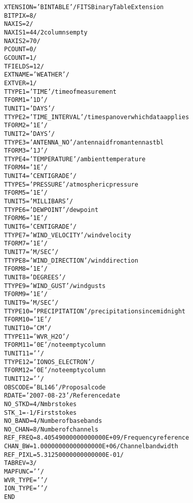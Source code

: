 \documentclass[twoside]{article}
\newcommand{\Me}[1]{\textcolor{mecol}{#1}}
\begin{document}
\begin{alltt}
XTENSION= 'BINTABLE'           / FITS Binary Table Extension
BITPIX  =                    8 /
NAXIS   =                    2 /
NAXIS1  =                   44 / \Me{2 columns empty}
NAXIS2  =                   70 /
PCOUNT  =                    0 /
GCOUNT  =                    1 /
TFIELDS =                   12 /
EXTNAME = 'WEATHER '           /
EXTVER  =                    1 /
TTYPE1  = 'TIME    '           / time of measurement
TFORM1  = '1D      '           /
TUNIT1  = 'DAYS    '           /
TTYPE2  = 'TIME_INTERVAL'      / time span over which data applies
TFORM2  = '1E      '           /
TUNIT2  = 'DAYS    '           /
TTYPE3  = 'ANTENNA_NO'         / antenna id from antennas tbl
TFORM3  = '1J      '           /
TTYPE4  = 'TEMPERATURE'        / ambient temperature
TFORM4  = '1E      '           /
TUNIT4  = 'CENTIGRADE'         /
TTYPE5  = 'PRESSURE'           / atmospheric pressure
TFORM5  = '1E      '           /
TUNIT5  = 'MILLIBARS'          /
TTYPE6  = 'DEWPOINT'           / dewpoint
TFORM6  = '1E      '           /
TUNIT6  = 'CENTIGRADE'         /
TTYPE7  = 'WIND_VELOCITY'      / wind velocity
TFORM7  = '1E      '           /
TUNIT7  = 'M/SEC   '           /
TTYPE8  = 'WIND_DIRECTION'     / wind direction
TFORM8  = '1E      '           /
TUNIT8  = 'DEGREES '           /
\Me{TTYPE9  = 'WIND_GUST'          / wind gusts}
\Me{TFORM9  = '1E      '           /}
\Me{TUNIT9  = 'M/SEC   '           /}
\Me{TTYPE10 = 'PRECIPITATION'      / precipitation since midnight}
\Me{TFORM10 = '1E      '           /}
\Me{TUNIT10 = 'CM      '           /}
TTYPE11 = 'WVR_H2O '           /
TFORM11 = '0E      '           / \Me{note empty column}
TUNIT11 = '        '           /
TTYPE12 = 'IONOS_ELECTRON'     /
TFORM12 = '0E      '           / \Me{note empty column}
TUNIT12 = '        '           /
OBSCODE = 'BL146   '           / Proposal code
RDATE   = '2007-08-23'         / Reference date
NO_STKD =                    4 / Nmbr stokes
STK_1   =                   -1 / First stokes
NO_BAND =                    4 / Number of basebands
NO_CHAN =                    8 / Number of channels
REF_FREQ=   8.40549000000000000E+09 / Frequency reference
CHAN_BW =   1.00000000000000000E+06 / Channel bandwidth
REF_PIXL=   5.31250000000000000E-01 /
TABREV  =                   \Me{3} /
MAPFUNC = '        '           /
WVR_TYPE= '        '           /
ION_TYPE= '        '           /
END
\end{alltt}
\end{document}
